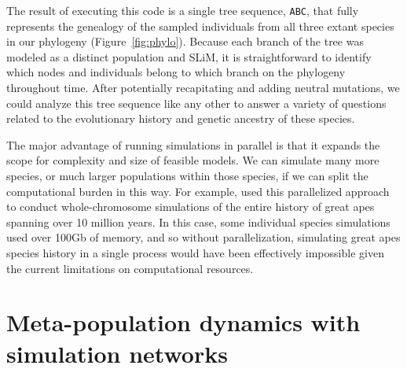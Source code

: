 \documentclass[12pt]{article}
\begin{document}
% 
% 
The result of executing this code is a single tree sequence,
\verb|ABC|,
that fully represents the genealogy of the sampled individuals from all three extant species in our phylogeny (Figure~\ref{fig:phylo}).
Because each branch of the tree was modeled as a distinct population and SLiM, it is straightforward to identify which nodes and individuals belong
to which branch on the phylogeny throughout time.
After potentially recapitating and adding neutral mutations, we could analyze this tree sequence
like any other to answer a variety of questions related to the evolutionary history and genetic ancestry of these species.

The major advantage of running simulations in parallel is that it expands the scope for complexity and size of feasible models.
We can simulate many more species, or much larger
populations within those species, if we can split the computational burden in this way.
For example, \citet{rodrigues_shared_2024} used this parallelized approach to conduct
whole-chromosome simulations of the entire history of great apes spanning over 10 million years.
In this case, some individual species simulations used over 100Gb of memory,
and so without parallelization, simulating great apes species history in a single process would have been effectively impossible given the current limitations on computational resources.

\section*{Meta-population dynamics with simulation networks}
\end{document}
